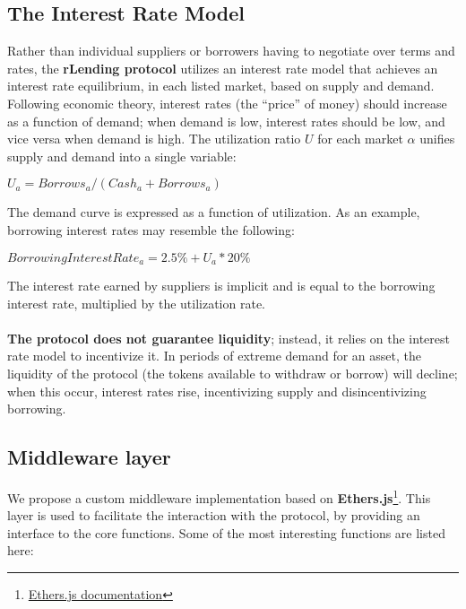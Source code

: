 \documentclass{article}
\begin{document}
\subsection{The Interest Rate Model}
Rather than individual suppliers or borrowers having to negotiate over terms and rates, the \textbf{rLending protocol} utilizes an interest rate model that achieves an interest rate equilibrium, in each listed market, based on supply and demand. Following economic theory, interest rates (the “price” of money) should increase as a function of demand; when demand is low, interest rates should be low, and vice versa when demand is high. The utilization ratio \textbf{$U$} for each market \textbf{$\alpha$} unifies supply and demand into a single variable:
\begin{center}
$U_{a} = Borrows_{a} / (Cash_{a} + Borrows_{a})$
\end{center}
The demand curve is expressed as a function of utilization. As an example, borrowing interest rates may resemble the following:
\begin{center}
$Borrowing Interest Rate_{a}= 2.5\% + U_{a} * 20\%$
\end{center}
The interest rate earned by suppliers is implicit and is equal to the borrowing interest rate,
multiplied by the utilization rate.
\\ \\
\textbf{The protocol does not guarantee liquidity}; instead, it relies on the interest rate model to incentivize it. In periods of extreme demand for an asset, the liquidity of the protocol (the tokens available to withdraw or borrow) will decline; when this occur, interest rates rise, incentivizing supply and disincentivizing borrowing.

\subsection{Middleware layer}
We propose a custom middleware implementation based on \textbf{Ethers.js}\footnote{\href{https://ethers.io}{Ethers.js documentation}}. This layer is used to facilitate the interaction with the protocol, by providing an interface to the core functions. Some of the most interesting functions are listed here: \\
\end{document}
